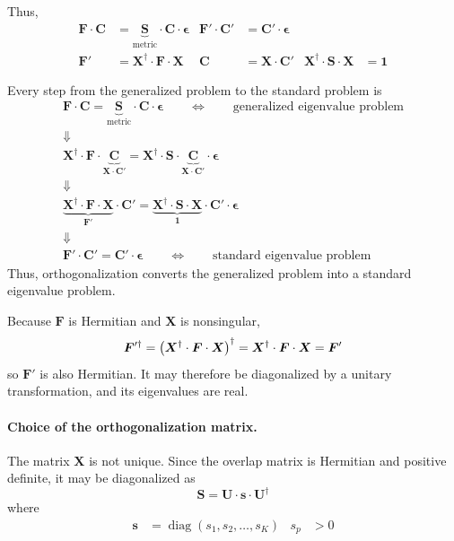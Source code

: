 \documentclass[11pt,a4paper,titlepage]{article}
\numberwithin{equation}{section}
\newcommand{\bs}{\boldsymbol{s}}
\newcommand{\bC}{\boldsymbol{C}}
\newcommand{\bF}{\boldsymbol{F}}
\newcommand{\bI}{\boldsymbol{1}}
\newcommand{\bS}{\boldsymbol{S}}
\newcommand{\bU}{\boldsymbol{U}}
\newcommand{\bX}{\boldsymbol{X}}
\newcommand{\beps}{\boldsymbol{\epsilon}}
\begin{document}
Thus,
\begin{align}
  \bF\cdot\bC
  &=
  \underbrace{\bS}_{\text{metric}}
  \cdot\bC\cdot\beps
  &
  \bF'\cdot\bC'
  &=
  \bC'\cdot\beps
  \\
  \bF'
  &=
  \bX^\dag\cdot\bF\cdot\bX
  &
  \bC
  &=
  \bX\cdot\bC'
  &
  \bX^\dag\cdot\bS\cdot\bX
  &=
  \bI
\end{align}

Every step from the generalized problem to the standard problem is
\begin{gather}
  \bF\cdot\bC
  =
  \underbrace{\bS}_{\text{metric}}
  \cdot\bC\cdot\beps
  \qquad\Longleftrightarrow\qquad
  \text{generalized eigenvalue problem}
  \\
  \Downarrow
  \\
  \bX^\dag\cdot\bF\cdot
  \underbrace{\bC}_{\bX\cdot\bC'}
  =
  \bX^\dag\cdot\bS\cdot
  \underbrace{\bC}_{\bX\cdot\bC'}\cdot\beps
  \\
  \Downarrow
  \\
  \underbrace{
    \bX^\dag\cdot\bF\cdot\bX
  }_{\bF'}
  \cdot\bC'
  =
  \underbrace{
    \bX^\dag\cdot\bS\cdot\bX
  }_{\bI}
  \cdot\bC'\cdot\beps
  \\
  \Downarrow
  \\
  \bF'\cdot\bC'
  =
  \bC'\cdot\beps
  \qquad\Longleftrightarrow\qquad
  \text{standard eigenvalue problem}
\end{gather}
Thus, orthogonalization converts the generalized problem into a standard
eigenvalue problem.

Because $\bF$ is Hermitian and $\bX$ is nonsingular,
\begin{equation}
  \bF'^\dag
  =
  \qty(
    \bX^\dag\cdot\bF\cdot\bX
  )^\dag
  =
  \bX^\dag\cdot\bF\cdot\bX
  =
  \bF'
\end{equation}
so $\bF'$ is also Hermitian. It may therefore be diagonalized by a unitary
transformation, and its eigenvalues are real.


\paragraph{Choice of the orthogonalization matrix.}

The matrix $\bX$ is not unique. Since the overlap matrix is Hermitian and
positive definite, it may be diagonalized as
\begin{equation}
  \bS
  =
  \bU\cdot\bs\cdot\bU^\dag
  \label{eq:overlap-diagonalization}
\end{equation}
where
\begin{align}
  \bs
  &=
  \operatorname{diag}(s_1,s_2,\ldots,s_K)
  &s_p&>0
\end{align}
\end{document}
